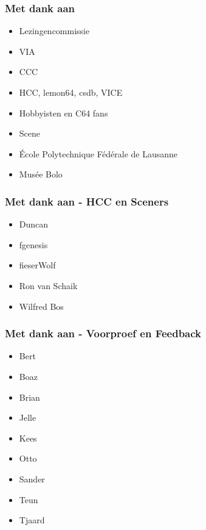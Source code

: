 \begin{frame}[noframenumbering]
\frametitle{Met dank aan}

\begin{itemize}
\item Lezingencommissie
\item VIA
\item CCC
\item HCC, lemon64, csdb, VICE
\item Hobbyisten en C64 fans
\item Scene
\item \'Ecole Polytechnique F\'ed\'erale de Lausanne
\item Mus\'ee Bolo
\end{itemize}

\end{frame}


\begin{frame}[noframenumbering]
\frametitle{Met dank aan - HCC en Sceners}

\begin{itemize}
\item Duncan
\item fgenesis
\item fieserWolf
\item Ron van Schaik
\item Wilfred Bos
\end{itemize}

\end{frame}


\begin{frame}[noframenumbering]
\frametitle{Met dank aan - Voorproef en Feedback}

\begin{itemize}
\item Bert
\item Boaz
\item Brian
\item Jelle
\item Kees
\item Otto
\item Sander
\item Teun
\item Tjaard
\end{itemize}

\end{frame}

